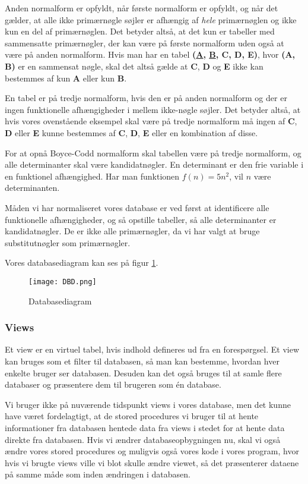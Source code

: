 Anden normalform er opfyldt, når første normalform er opfyldt, og når det gælder, at alle ikke primærnøgle søjler er afhængig af \textit{hele} primærnøglen og ikke kun en del af primærnøglen.
Det betyder altså, at det kun er tabeller med sammensatte primærnøgler, der kan være på første normalform uden også at være på anden normalform. Hvis man har en tabel \textbf{(\underline{A}, \underline{B}, C, D, E)}, hvor \textbf{(A, B)} er en sammensat nøgle, skal det altså gælde at \textbf{C}, \textbf{D} og \textbf{E} ikke kan bestemmes af kun \textbf{A} eller kun \textbf{B}.

En tabel er på tredje normalform, hvis den er på anden normalform og der er ingen funktionelle afhængigheder i mellem ikke-nøgle søjler.
Det betyder altså, at hvis vores ovenstående eksempel skal være på tredje normalform må ingen af \textbf{C}, \textbf{D} eller \textbf{E} kunne bestemmes af \textbf{C}, \textbf{D}, \textbf{E} eller en kombination af disse.

For at opnå Boyce-Codd normalform skal tabellen være på tredje normalform, og alle determinanter skal være kandidatnøgler.
En determinant er den frie variable i en funktionel afhængighed. Har man funktionen \(f(n) = 5n^2 \), vil \(n\) være determinanten.\cite{database}

Måden vi har normaliseret vores database er ved først at identificere alle funktionelle afhængigheder, og så opstille tabeller, så alle determinanter er kandidatnøgler.
De er ikke alle primærnøgler, da vi har valgt at bruge substitutnøgler som primærnøgler.

Vores databasediagram kan ses på figur \ref{databasediagram}.

\begin{figure}[h]
    \caption{Databasediagram}
    \centering
        \texttt{[image: DBD.png]}
    \label{databasediagram}
\end{figure}

\subsubsection{Views}

Et view er en virtuel tabel, hvis indhold defineres ud fra en forespørgsel.
Et view kan bruges som et filter til databasen, så man kan bestemme, hvordan hver enkelte bruger ser databasen.
Desuden kan det også bruges til at samle flere databaser og præsentere dem til brugeren som én database.

Vi bruger ikke på nuværende tidspunkt views i vores database, men det kunne have været fordelagtigt, at de stored procedures vi bruger til at hente informationer fra databasen hentede data fra views i stedet for at hente data direkte fra databasen.
Hvis vi ændrer databaseopbygningen nu, skal vi også ændre vores stored procedures og muligvis også vores kode i vores program, hvor hvis vi brugte views ville vi blot skulle ændre viewet, så det præsenterer dataene på samme måde som inden ændringen i databasen.


